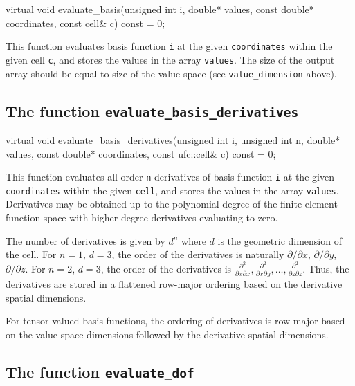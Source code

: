 \begin{code}
virtual void evaluate_basis(unsigned int i,
                            double* values,
                            const double* coordinates,
                            const cell& c) const = 0;
\end{code}

This function evaluates basis function \texttt{i} at the given
\texttt{coordinates} within the given cell \texttt{c}, and stores the
values in the array \texttt{values}. The size of the output array
should be equal to size of the value space (see
\texttt{value\_dimension} above).

\subsection{The function \texttt{evaluate\_basis\_derivatives}}

\begin{code}
virtual void
evaluate_basis_derivatives(unsigned int i,
                           unsigned int n,
                           double* values,
                           const double* coordinates,
                           const ufc::cell& c) const = 0;
\end{code}

This function evaluates all order \texttt{n} derivatives of basis
function \texttt{i} at the given \texttt{coordinates} within the given
\texttt{cell}, and stores the values in the array \texttt{values}.
Derivatives may be obtained up to the polynomial degree of the finite
element function space with higher degree derivatives evaluating to
zero.

The number of derivatives is given by $d^n$ where $d$ is the geometric
dimension of the cell. For $n = 1$, $d = 3$, the order of the
derivatives is naturally $\partial/\partial x$, $\partial/\partial y$,
$\partial/\partial z$. For $n = 2$, $d = 3$, the order of the
derivatives is $\frac{\partial^2}{\partial x\partial x},
\frac{\partial^2}{\partial x\partial y}, \ldots,
\frac{\partial^2}{\partial z\partial z}$. Thus, the derivatives are
stored in a flattened row-major ordering based on the derivative
spatial dimensions.

For tensor-valued basis functions, the ordering of derivatives is
row-major based on the value space dimensions followed by the
derivative spatial dimensions.

\subsection{The function \texttt{evaluate\_dof}}


